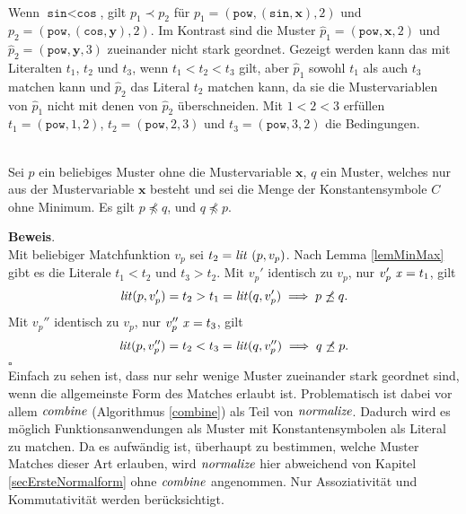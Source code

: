 \begin{beispiel}~\\
Wenn $\texttt{sin} < \texttt{cos}$, gilt $p_1 \prec p_2$ für $p_1 = (\texttt{pow}, (\texttt{sin}, \mathbf x), 2)$ und $p_2 = (\texttt{pow}, (\texttt{cos}, \mathbf y), 2)$. Im Kontrast sind die Muster $\hat p_1 = (\texttt{pow}, \mathbf x, 2)$ und $\hat p_2 = (\texttt{pow}, \mathbf y, 3)$ zueinander nicht stark geordnet. Gezeigt werden kann das mit Literalten $t_1$, $t_2$ und $t_3$, wenn ${t_1 < t_2 < t_3}$ gilt, aber $\hat p_1$ sowohl $t_1$ als auch $t_3$ matchen kann und $\hat p_2$ das Literal $t_2$ matchen kann, da sie die Mustervariablen von $\hat p_1$ nicht mit denen von $\hat p_2$ überschneiden. Mit $1 < 2 < 3$ erfüllen $t_1 = (\texttt{pow}, 1, 2)$, $t_2 = (\texttt{pow}, 2, 3)$ und $t_3 = (\texttt{pow}, 3, 2)$ die Bedingungen.
\end{beispiel}

\begin{lemma}~\\
Sei $p$ ein beliebiges Muster ohne die Mustervariable $\mathbf x$, $q$ ein Muster, welches nur aus der Mustervariable $\mathbf x$ besteht und sei die Menge der Konstantensymbole $C$ ohne Minimum.
Es gilt $p \not\preceq q$, und $q \not\preceq p$.
\end{lemma}

\textbf{Beweis}.\\
Mit beliebiger Matchfunktion $v_p$ sei $t_2 = \mathit{lit}~(p, v_p)$. Nach Lemma \ref{lemMinMax} gibt es die Literale $t_1 < t_2$ und $t_3 > t_2$. 
Mit $v_p'$ identisch zu $v_p$, nur $v_p'~\mathit{x} = t_1$, gilt 
$$\mathit{lit}(p, v_p') = t_2 > t_1 = \mathit{lit}(q, v_p') \implies p \not\preceq q.$$
Mit $v_p''$ identisch zu $v_p$, nur $v_p''~\mathit{x} = t_3$, gilt 
$$\mathit{lit}(p, v_p'') = t_2 < t_3 = \mathit{lit}(q, v_p'') \implies q \not\preceq p.$$
\hfill $\square$\\


Einfach zu sehen ist, dass nur sehr wenige Muster zueinander stark geordnet sind, wenn die allgemeinste Form des Matches erlaubt ist. Problematisch ist dabei vor allem $\mathit{combine}$ (Algorithmus \ref{combine}) als Teil von $\mathit{normalize}$. Dadurch wird es möglich Funktionsanwendungen als Muster mit Konstantensymbolen als Literal zu matchen. Da es aufwändig ist, überhaupt zu bestimmen, welche Muster Matches dieser Art erlauben, wird $\mathit{normalize}$ hier abweichend von Kapitel \ref{secErsteNormalform} ohne $\mathit{combine}$ angenommen. Nur Assoziativität und Kommutativität werden berücksichtigt.

